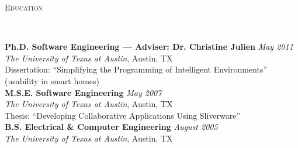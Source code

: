 \documentclass[9pt]{article}
\newenvironment{changemargin}[2]{%
  \begin{list}{}{%
    \setlength{\topsep}{0pt}%
    \setlength{\leftmargin}{#1}%
    \setlength{\rightmargin}{#2}%
    \setlength{\listparindent}{\parindent}%
    \setlength{\itemindent}{\parindent}%
    \setlength{\parsep}{\parskip}%
  }%
  \item[]}{\end{list}
}
\newcommand{\lineover}{
	\begin{changemargin}{-0.05in}{-0.05in}
		\vspace*{-8pt}
		\hrulefill \\
		\vspace*{-2pt}
	\end{changemargin}
}
\newcommand{\header}[1]{
	\begin{changemargin}{-0.5in}{-0.5in}
		\scshape{#1}\\
  	\lineover
	\end{changemargin}
}
\newenvironment{body} {
	\vspace*{-16pt}
	\begin{changemargin}{-0.25in}{-0.5in}
  }	
	{\end{changemargin}
}
\begin{document}
\begin{body}


\end{body}

\medskip


\header{Education}

\begin{body}
	\vspace{14pt}
	\textbf{Ph.D. Software Engineering --- Adviser: Dr. Christine Julien}{} \hfill \emph{May 2011}{} \\
	\emph{The University of Texas at Austin}, Austin, TX{} \\
	Dissertation: ``Simplifying the Programming of Intelligent Environments'' (usability in smart homes)\\
  \medskip
	\textbf{M.S.E. Software Engineering}{} \hfill \emph{May 2007}{} \\
	\emph{The University of Texas at Austin}, Austin, TX{} \\
	Thesis: ``Developing Collaborative Applications Using Sliverware''\\
  \medskip
	\textbf{B.S. Electrical \& Computer Engineering} \hfill \emph{August 2005} \\
	\emph{The University of Texas at Austin}, Austin, TX\\
\end{body}
\end{document}

